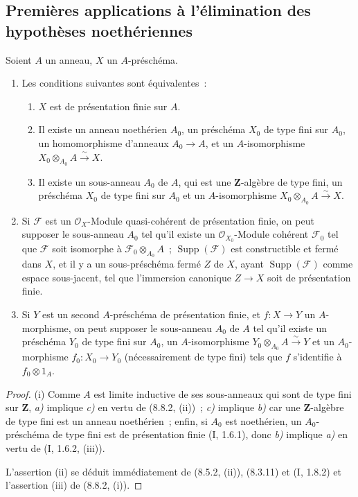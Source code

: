 \subsection{Premières applications à l'élimination des hypothèses noethériennes}
\label{subsection:IV.8.9-fr}

\begin{proposition}[8.9.1]
\label{IV.8.9.1-fr}
Soient $A$ un anneau, $X$ un $A$-préschéma.
\begin{enumerate}
\item[(i)] Les conditions suivantes sont équivalentes~:
\begin{enumerate}
\item[\emph{a)}] $X$ est de présentation finie sur $A$.
\item[\emph{b)}] Il existe un anneau noethérien $A_0$, un préschéma $X_0$ de
type fini sur $A_0$, un homomorphisme d'anneaux $A_0\to A$, et un
$A$-isomorphisme $X_0\otimes_{A_0}A\xrightarrow{\sim}X$.
\item[\emph{c)}] Il existe un sous-anneau $A_0$ de $A$, qui est une
$\mathbf Z$-algèbre de type fini, un préschéma $X_0$ de type fini sur $A_0$ et
un $A$-isomorphisme $X_0\otimes_{A_0}A\xrightarrow{\sim}X$.
\end{enumerate}
\item[(ii)] Si $\mathcal F$ est un $\mathcal O_X$-Module quasi-cohérent de
présentation finie, on peut supposer le sous-anneau $A_0$ tel qu'il existe un
$\mathcal O_{X_0}$-Module cohérent $\mathcal F_0$ tel que $\mathcal F$ soit
isomorphe à $\mathcal F_0\otimes_{A_0}A$~;
$\operatorname{Supp}(\mathcal F)$ est constructible et fermé dans $X$, et il
y a un sous-préschéma fermé $Z$ de $X$, ayant
$\operatorname{Supp}(\mathcal F)$ comme espace sous-jacent, tel que
l'immersion canonique $Z\to X$ soit de présentation finie.
\item[(iii)] Si $Y$ est un second $A$-préschéma de présentation finie, et
$f:X\to Y$ un $A$-morphisme, on peut supposer le sous-anneau $A_0$ de $A$ tel
qu'il existe un préschéma $Y_0$ de type fini sur $A_0$, un $A$-isomorphisme
$Y_0\otimes_{A_0}A\xrightarrow{\sim}Y$ et un $A_0$-morphisme
$f_0:X_0\to Y_0$ (nécessairement de type fini) tels que $f$ s'identifie à
$f_0\otimes1_A$.
\end{enumerate}
\end{proposition}

\begin{proof}
(i) Comme $A$ est limite inductive de ses sous-anneaux qui sont de type fini
sur $\mathbf Z$, \emph{a)} implique \emph{c)} en vertu de (8.8.2, (ii))~;
\emph{c)} implique \emph{b)} car une $\mathbf Z$-algèbre de type fini est un
anneau noethérien~; enfin, si $A_0$ est noethérien, un $A_0$-préschéma de type
fini est de présentation finie (I, 1.6.1), donc \emph{b)} implique \emph{a)}
en vertu de (I, 1.6.2, (iii)).

L'assertion (ii) se déduit immédiatement de (8.5.2, (ii)), (8.3.11) et
(I, 1.8.2) et l'assertion (iii) de (8.8.2, (i)).
\end{proof}

